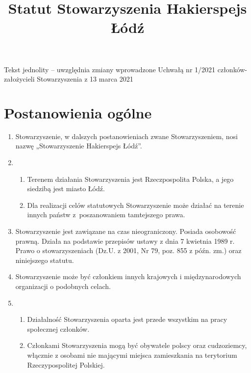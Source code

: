 \documentclass[chapterprefix,notitlepage]{article}
\begin{document}
\title{Statut Stowarzyszenia Hakierspejs Łódź}
\author{}
\date{}

\maketitle

\begin{center}
\large Tekst jednolity – uwzględnia zmiany wprowadzone Uchwałą nr 1/2021 członków-założycieli Stowarzyszenia z 13 marca 2021
\end{center}

\section{Postanowienia ogólne}

\begin{enumerate}

	\item Stowarzyszenie, w dalszych postanowieniach zwane Stowarzyszeniem, nosi nazwę „Stowarzyszenie Hakierspejs Łódź”.
	
	\item \begin{enumerate}
		\item Terenem działania Stowarzyszenia jest Rzeczpospolita Polska, a jego siedzibą jest miasto Łódź.
		\item Dla realizacji celów statutowych Stowarzyszenie może działać na terenie innych państw z~poszanowaniem tamtejszego prawa.
	\end{enumerate}
	
	\item Stowarzyszenie jest zawiązane na czas nieograniczony. Posiada osobowość prawną. Działa na podstawie przepisów ustawy z dnia 7 kwietnia 1989 r. Prawo o stowarzyszeniach (Dz.U. z 2001, Nr 79, poz. 855 z późn. zm.) oraz niniejszego statutu.
	
	\item Stowarzyszenie może być członkiem innych krajowych i międzynarodowych organizacji o podobnych celach.
	
	\item \begin{enumerate}
		\item Działalność Stowarzyszenia oparta jest przede wszystkim na pracy społecznej członków.
		\item Członkami Stowarzyszenia mogą być obywatele polscy oraz cudzoziemcy, włącznie z osobami nie mającymi miejsca zamieszkania na terytorium Rzeczypospolitej Polskiej.
	\end{enumerate}
	

\end{enumerate}
\end{document}
